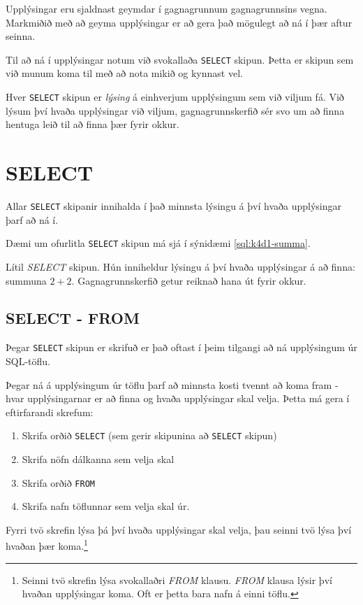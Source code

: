 Upplýsingar eru sjaldnast geymdar í gagnagrunnum gagnagrunnsins vegna. Markmiðið með að geyma upplýsingar er að gera það mögulegt að ná í þær aftur seinna.

Til að ná í upplýsingar notum við svokallaða \verb|SELECT| skipun. Þetta er skipun sem við munum koma til með að nota mikið og kynnast vel.

Hver \verb|SELECT| skipun er \emph{lýsing} á einhverjum upplýsingum sem við viljum fá. Við lýsum því hvaða upplýsingar við viljum, gagnagrunnskerfið sér svo um að finna hentuga leið til að finna þær fyrir okkur.
\section{SELECT}
Allar \verb|SELECT| skipanir innihalda í það minnsta lýsingu á því hvaða upplýsingar þarf að ná í.

Dæmi um ofurlitla \verb|SELECT| skipun má sjá í sýnidæmi \ref{sql:k4d1-summa}.

\begin{example}
\caption[Lágmarks SELECT]{Lítil \emph{SELECT} skipun. Hún inniheldur lýsingu á því hvaða upplýsingar á að finna: summuna $2+2$. Gagnagrunnskerfið getur reiknað hana út fyrir okkur.}
\label{sql:k4d1-summa}
\centering
{}
\end{example}

\subsection{SELECT - FROM}
\label{undirkafli:from}
Þegar \verb|SELECT| skipun er skrifuð er það oftast í þeim tilgangi að ná upplýsingum úr SQL-töflu.

Þegar ná á upplýsingum úr töflu þarf að minnsta kosti tvennt að koma fram - hvar upplýsingarnar er að finna og hvaða upplýsingar skal velja. Þetta má gera í eftirfarandi skrefum:

\begin{enumerate}
 \item Skrifa orðið \verb|SELECT| (sem gerir skipunina að \verb|SELECT| skipun)
 \item Skrifa nöfn dálkanna sem velja skal
 \item Skrifa orðið \verb|FROM|
 \item Skrifa nafn töflunnar sem velja skal úr.
\end{enumerate}
Fyrri tvö skrefin lýsa þá því hvaða upplýsingar skal velja, þau seinni tvö lýsa því hvaðan þær koma.\footnote{Seinni tvö skrefin lýsa svokallaðri \emph{FROM} klausu. \emph{FROM} klausa lýsir því hvaðan upplýsingar koma. Oft er þetta bara nafn á einni töflu.}

